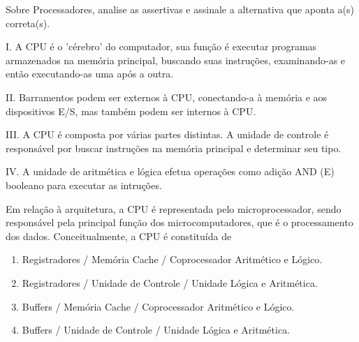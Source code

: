 \documentclass[aspectratio=169,
				xcolor=table]{beamer}
\begin{document}
	\begin{frame}
	
	Sobre Processadores, analise as assertivas e assinale a alternativa que aponta a(s) correta(s). 
	\vspace{1em}

		I. A CPU é o 'cérebro' do computador, sua função é executar programas armazenados na memória principal, buscando suas instruções, examinando-as e então executando-as uma após a outra. 
		
		\vspace{.7em}
		II. Barramentos podem ser externos à CPU, conectando-a à memória e aos dispositivos E/S, mas também podem ser internos à CPU. 
		
		\vspace{.7em}
		III. A CPU é composta por várias partes distintas. A unidade de controle é responsável por buscar instruções na memória principal e determinar seu tipo. 
		
		\vspace{.7em}
		IV. A unidade de aritmética e lógica efetua operações como adição AND (E) booleano para executar as intruções. 
	\end{frame}
	
	\begin{frame}
		Em relação à arquitetura, a CPU é representada pelo microprocessador, sendo responsável pela principal função dos microcomputadores, que é o processamento dos dados. Conceitualmente, a CPU é constituída de 
		
		\begin{enumerate}[a]
			\item Registradores / Memória Cache / Coprocessador Aritmético e Lógico.
			\item Registradores / Unidade de Controle / Unidade Lógica e Aritmética.
			\item Buffers / Memória Cache / Coprocessador Aritmético e Lógico.
			\item Buffers / Unidade de Controle / Unidade Lógica e Aritmética.
		\end{enumerate}


	\end{frame}
	
\end{document}

